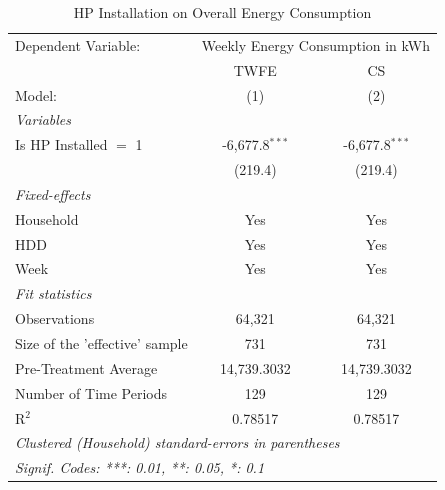 
\begin{table}[htbp]
   \caption{\label{tab:hp-did-overall-conso} HP Installation on Overall Energy Consumption}
   \centering
   \begin{tabular}{lcc}
      \tabularnewline \midrule \midrule
      Dependent Variable: & \multicolumn{2}{c}{Weekly Energy Consumption in kWh}\\
                                     & TWFE             & CS \\   
      Model:                         & (1)              & (2)\\  
      \midrule
      \emph{Variables}\\
      Is HP Installed $=$ 1          & -6,677.8$^{***}$ & -6,677.8$^{***}$\\   
                                     & (219.4)          & (219.4)\\   
      \midrule
      \emph{Fixed-effects}\\
      Household                      & Yes              & Yes\\  
      HDD                            & Yes              & Yes\\  
      Week                           & Yes              & Yes\\  
      \midrule
      \emph{Fit statistics}\\
      Observations                   & 64,321           & 64,321\\  
      Size of the 'effective' sample & 731              & 731\\  
      Pre-Treatment Average          & 14,739.3032      & 14,739.3032\\  
      Number of Time Periods         & 129              & 129\\  
      R$^2$                          & 0.78517          & 0.78517\\  
      \midrule \midrule
      \multicolumn{3}{l}{\emph{Clustered (Household) standard-errors in parentheses}}\\
      \multicolumn{3}{l}{\emph{Signif. Codes: ***: 0.01, **: 0.05, *: 0.1}}\\
   \end{tabular}
\end{table}


